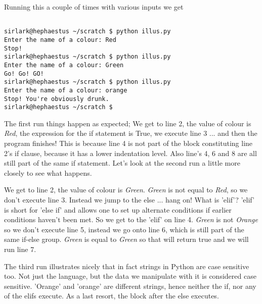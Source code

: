 Running this a couple of times with various inputs we get
\begin{lstlisting}

sirlark@hephaestus ~/scratch $ python illus.py 
Enter the name of a colour: Red
Stop!
sirlark@hephaestus ~/scratch $ python illus.py 
Enter the name of a colour: Green
Go! Go! GO!
sirlark@hephaestus ~/scratch $ python illus.py 
Enter the name of a colour: orange
Stop! You're obviously drunk.
sirlark@hephaestus ~/scratch $
\end{lstlisting}

The first run things happen as expected; We get to line 2, the value   of colour is \textit{Red}, the expression for the if statement is True,   we execute line 3 ... and then the program finishes! This is because   line 4 is not part of the block constituting line 2's if clause,   because it has a lower indentation level. Also line's 4, 6 and 8 are   all still part of the same if statement. Let's look at the second run a   little more closely to see what happens.

We get to line 2, the value of colour is \textit{Green}.   \textit{Green} is not equal to \textit{Red}, so we don't execute line   3. Instead we jump to the else ... hang on! What is 'elif'? 'elif' is   short for 'else if' and allows one to set up alternate conditions if   earlier conditions haven't been met. So we get to the 'elif' on line 4.   \textit{Green} is not \textit{Orange} so we don't execute line 5, instead we go onto line 6, which is still part of the same if-else group. \textit{Green} is equal to \textit{Green} so that will return true and we will run line 7.

The third run illustrates nicely that in fact strings in Python are   case sensitive too. Not just the language, but the data we manipulate   with it is considered case sensitive. 'Orange' and 'orange' are different   strings, hence neither the if, nor any of the elifs execute. As a last resort, the block after the else executes.

